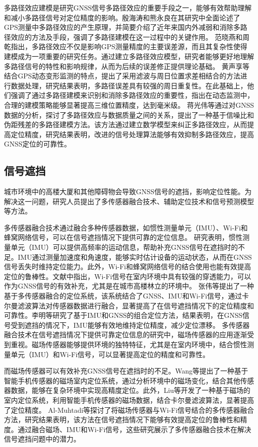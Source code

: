 \documentclass[12pt,hyperref,a4paper,UTF8]{ctexart}
\begin{document}
多路径效应建模是研究GNSS信号多路径效应的重要手段之一，能够有效帮助理解和减小多路径信号对定位精度的影响。殷海涛和熊永良\cite{yinhaitao2003}在其研究中全面论述了GPS测量中多路径效应的产生原理，并简要介绍了近年来国内外减弱和消除多路径效应的方法及手段，强调了多路径建模在这一过程中的关键作用。
范晓燕和周乾\cite{fanxiaoyan2010}指出，多路径效应不仅是影响GPS测量精度的主要误差源，而且其复杂性使得建模成为一项重要的研究任务。通过建立多路径效应模型，研究者能够更好地理解多路径信号的特性和影响规律，从而为后续的误差修正提供理论基础。
黄声享等\cite{huangshengxiang2005}结合GPS动态变形监测的特点，提出了采用滤波与周日位置求差相结合的方法进行数据处理，研究结果表明，多路径误差具有较强的周日重复性。在此基础上，他们强调了通过多路径建模来识别和消除多路径效应的重要性，指出在动态监测中，合理的建模策略能够显著提高三维位置精度，达到毫米级。
蒋光伟等\cite{jiangguangwei2018}通过对GNSS数据的分析，探讨了多路径效应与数据质量之间的关系，提出了一种基于信噪比和伪距残差的多路径建模方法。该方法通过建立数学模型来纠正多路径效应，从而提高定位精度，研究结果表明，改进的信号处理算法能够有效抑制多路径效应，提高GNSS定位的可靠性。

\subsection{信号遮挡}
城市环境中的高楼大厦和其他障碍物会导致GNSS信号的遮挡，影响定位性能。为解决这一问题，研究人员提出了多传感器融合技术、辅助定位技术和信号预测模型等方法。

多传感器融合技术通过融合多种传感器数据，如惯性测量单元（IMU）、Wi-Fi和蜂窝网络信号，可以在信号遮挡情况下提供可靠的定位信息。
研究表明，惯性测量单元（IMU）可以提供高频率的运动信息，帮助补充GNSS信号在遮挡时的不足。IMU通过测量加速度和角速度，能够实时估计设备的运动状态，从而在GNSS信号丢失时维持定位能力\cite{2019li}。此外，Wi-Fi和蜂窝网络信号的结合使用也能有效提高定位的鲁棒性。文献中指出，Wi-Fi信号在室内环境中具有较强的穿透能力，可以作为GNSS信号的有效补充，尤其是在城市高楼林立的环境中\cite{2020zhang}。
张伟等\cite{2020zhang}提出了一种基于多传感器融合的定位系统，该系统结合了GNSS、IMU和Wi-Fi信号，通过卡尔曼滤波算法对传感器数据进行融合，显著提高了在信号遮挡情况下的定位精度和可靠性。李明等\cite{2019li}研究了基于IMU和GNSS的组合定位方法，结果表明，在GNSS信号受到遮挡的情况下，IMU能够有效地维持定位精度，减少定位漂移。
多传感器融合技术在信号遮挡情况下提供可靠定位信息的研究中，磁场传感器的应用逐渐受到重视。磁场传感器能够提供环境的独特特征，尤其是在室内环境中，结合惯性测量单元（IMU）和Wi-Fi信号，可以显著提高定位的精度和可靠性。

而磁场传感器可以有效补充GNSS信号在遮挡时的不足。Wang等\cite{2018wang}提出了一种基于智能手机传感器的磁场室内定位系统，通过分析环境中的磁场变化，结合其他传感器数据，能够在复杂环境中实现高精度定位。此外，Liu等\cite{2017liu}开发了一种基于磁场的室内定位系统，利用智能手机传感器的磁场数据，结合卡尔曼滤波算法，显著提高了定位精度。
Al-Muhtadi等\cite{2020almuhtadi}探讨了将磁场传感器与Wi-Fi信号结合的多传感器融合方法，研究结果表明，该方法在信号遮挡情况下能够有效提高定位的鲁棒性和精度。通过融合磁场、IMU和Wi-Fi信号，这些研究展示了多传感器融合技术在解决信号遮挡问题中的潜力。
\end{document}
